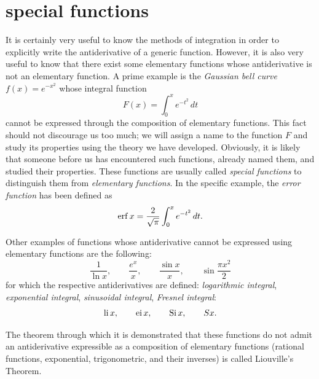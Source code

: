 \section{special functions}

It is certainly very useful to know the methods of integration in order to
explicitly write the antiderivative of a generic function. However, it is also
very useful to know that there exist some elementary functions whose
antiderivative is not an elementary function. A prime example is the
\emph{Gaussian bell curve}%
%
%
%
%
$f(x) = e^{-x^2}$ whose integral function 
\[
 F(x) = \int_0^x e^{-t^2}\, dt
\]
cannot be expressed through the composition of elementary functions. This fact
should not discourage us too much; we will assign a name to the function $F$ and
study its properties using the theory we have developed. Obviously, it is likely
that someone before us has encountered such functions, already named them, and
studied their properties. These functions are usually called \emph{special
functions} to distinguish them from \emph{elementary functions}.
%
%
%
%
In the specific example, the \emph{error function}%
%
has been defined as
\[
  \operatorname{erf} x = \frac{2}{\sqrt \pi} \int_0^x e^{-t^2}\, dt.
\]

Other examples of functions whose antiderivative cannot be expressed using
elementary functions are the following:
\[
  \frac{1}{\ln x}, \qquad 
  \frac{e^x}{x}, \qquad
  \frac{\sin x}{x}, \qquad \sin\frac{\pi x^2}{2}
\]
for which the respective antiderivatives are defined: \emph{logarithmic
integral}, \emph{exponential integral}, \emph{sinusoidal integral},
\emph{Fresnel integral}:
\[
\operatorname{li} x, \qquad 
\operatorname{ei} x, \qquad 
\operatorname{Si} x, \qquad
S x.
\]

The theorem through which it is demonstrated that these functions do not admit
an antiderivative expressible as a composition of elementary functions (rational
functions, exponential, trigonometric, and their inverses) is called Liouville's
Theorem.%
\newsavebox{\qrDeLellis}%
